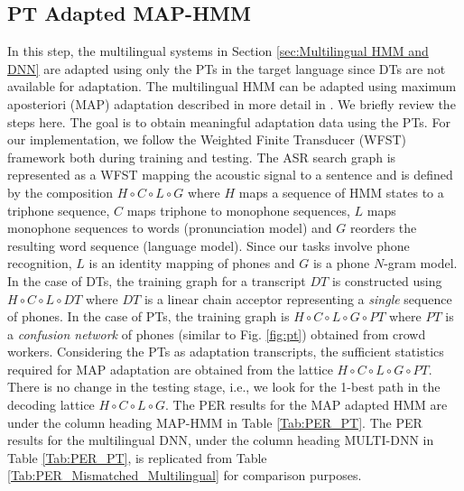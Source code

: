 \documentclass[a4paper]{article}
\begin{document}
\subsection{PT Adapted MAP-HMM}
\label{sec:PT Adapted MAP-HMM}
In this step, the multilingual systems in Section \ref{sec:Multilingual HMM and DNN} are adapted using only the PTs in the target language since DTs are not available for adaptation. The multilingual HMM can be adapted using maximum aposteriori (MAP) adaptation described in more detail in \cite{Liu-PTAdaptedGMM}. We briefly review the steps here. The goal is to obtain meaningful adaptation data using the PTs. For our implementation, we follow the Weighted Finite Transducer (WFST)~\cite{Mohri-WFST} framework both during training and testing. The ASR search graph is represented as a WFST mapping the acoustic signal to a sentence and is defined by the composition $H \circ C \circ L \circ G$ where $H$ maps a sequence of HMM states to a triphone sequence, $C$ maps triphone to monophone sequences, $L$ maps monophone sequences to words (pronunciation model) and $G$ reorders the resulting word sequence (language model). Since our tasks involve phone recognition, $L$ is an identity mapping of phones and $G$ is a phone $N$-gram model. In the case of DTs, the training graph for a transcript $DT$ is constructed using $H \circ C \circ L \circ DT$ where $DT$ is a linear chain acceptor representing a \emph{single} sequence of phones. In the case of PTs, the training graph is $H \circ C \circ L \circ G \circ PT$ where $PT$ is a \emph{confusion network} of phones (similar to Fig. \ref{fig:pt}) obtained from crowd workers. Considering the PTs as adaptation transcripts, the sufficient statistics required for MAP adaptation are obtained from the lattice  $H \circ C \circ L \circ G \circ PT$. There is no change in the testing stage, i.e., we look for the 1-best path in the decoding lattice $H \circ C \circ L \circ G$. The PER results for the MAP adapted HMM are under the column heading MAP-HMM in Table \ref{Tab:PER_PT}. The PER results for the multilingual DNN, under the column heading MULTI-DNN in Table \ref{Tab:PER_PT}, is replicated from Table \ref{Tab:PER_Mismatched_Multilingual} for comparison purposes.
\end{document}
